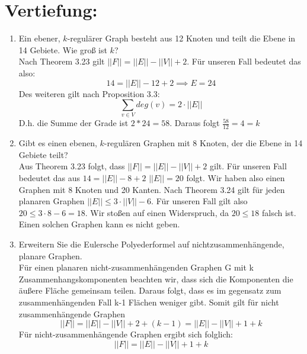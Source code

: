 

\usepackage{wrapfig}
\usepackage{color}


    \maketitle
    \section*{Vertiefung:}
    \begin{enumerate}[label=(\alph*)]
        \item  Ein ebener, $k$-regulärer Graph besteht aus 12 Knoten und teilt die Ebene in 14 Gebiete. 
        Wie groß ist $k$? \\
        Nach Theorem 3.23 gilt $||F|| = ||E|| - ||V|| + 2$. Für unseren Fall bedeutet das also:
        $$14 = ||E|| - 12 + 2 \implies E = 24$$ Des weiteren gilt nach Proposition 3.3:
        $$\sum_{v \in V} deg(v) = 2 \cdot ||E||$$ D.h. die Summe der Grade ist $2 * 24 = 58$.
        Daraus folgt $\frac{58}{12} = 4 = k$
        
        \item Gibt es einen ebenen, $k$-regulären Graphen mit 8 Knoten, der die Ebene in 14 Gebiete
        teilt? \\  
        Aus Theorem 3.23 folgt, dass $||F|| = ||E|| - ||V|| + 2$ gilt. Für unseren Fall bedeutet 
        das aus $ 14 = ||E|| - 8 + 2 $ $ ||E|| = 20 $ folgt. Wir haben also einen Graphen mit 8 Knoten 
        und 20 Kanten. Nach Theorem 3.24 gilt für jeden planaren Graphen $ ||E|| \leq 3 \cdot ||V|| - 6$. 
        Für unseren Fall gilt also $20 \leq 3 \cdot 8 - 6  = 18$.
        Wir stoßen auf einen Widerspruch, da $20 \leq 18$ falsch ist. Einen solchen Graphen kann es nicht geben.
        
        \item Erweitern Sie die Eulersche Polyederformel auf nichtzusammenhängende, planare Graphen. \\
        Für einen planaren nicht-zusammenhängenden Graphen G mit k Zusammenhangskomponenten beachten 
        wir, dass sich die Komponenten die äußere Fläche gemeinsam teilen. Daraus folgt, dass es im gegensatz 
        zum zusammenhängenden Fall k-1 Flächen weniger gibt. Somit gilt für nicht zusammenhängende Graphen 
        $$||F|| = ||E|| - ||V|| + 2 + (k-1) = ||E|| - ||V|| + 1 + k$$ Für nicht-zusammenhängende Graphen 
        ergibt sich folglich: $$||F|| = ||E|| - ||V|| + 1 + k $$
       

\end{enumerate}

